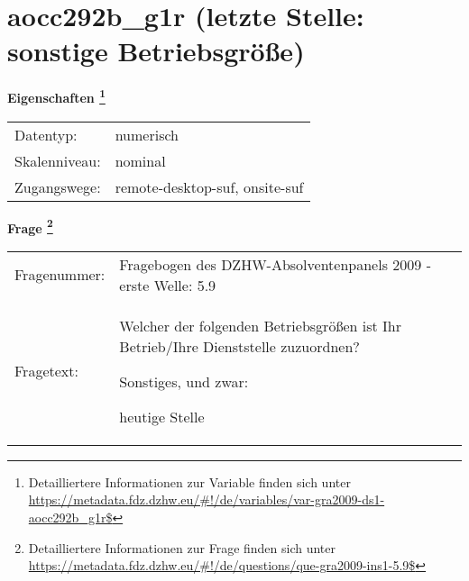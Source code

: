 
    \setcounter{footnote}{0}

    \vspace*{-1.8cm}
	\section{aocc292b\_g1r (letzte Stelle: sonstige Betriebsgröße)}
	\label{section:aocc292b_g1r}



    \vspace*{0.5cm}
    \noindent\textbf{Eigenschaften
	\footnote{Detailliertere Informationen zur Variable finden sich unter
		\url{https://metadata.fdz.dzhw.eu/\#!/de/variables/var-gra2009-ds1-aocc292b_g1r$}}}\\
	\begin{tabularx}{\hsize}{@{}lX}
	Datentyp: & numerisch \\
	Skalenniveau: & nominal \\
	Zugangswege: &
	  remote-desktop-suf, 
	  onsite-suf
 \\
    \end{tabularx}



				\vspace*{0.5cm}
                \noindent\textbf{Frage
	                \footnote{Detailliertere Informationen zur Frage finden sich unter
		              \url{https://metadata.fdz.dzhw.eu/\#!/de/questions/que-gra2009-ins1-5.9$}}}\\
				\begin{tabularx}{\hsize}{@{}lX}
					Fragenummer: &
					  Fragebogen des DZHW-Absolventenpanels 2009 - erste Welle:
					  5.9
 \\
					Fragetext: & Welcher der folgenden Betriebsgrößen ist Ihr Betrieb/Ihre Dienststelle zuzuordnen?\par  Sonstiges, und zwar:\par  heutige Stelle \\
				\end{tabularx}





